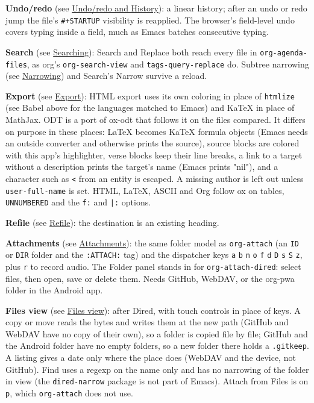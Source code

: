 \documentclass[11pt]{article}
\begin{document}
\textbf{Undo/redo} (see \hyperref[sec:org82ca105]{Undo/redo and History}): a linear history; after an undo or redo jump the file's \texttt{\#+STARTUP} visibility is reapplied. The browser's field-level undo covers typing inside a field, much as Emacs batches consecutive typing.

\textbf{Search} (see \hyperref[sec:org22ae446]{Searching}): Search and Replace both reach every file in \texttt{org-agenda-files}, as org's \texttt{org-search-view} and \texttt{tags-query-replace} do. Subtree narrowing (see \hyperref[sec:org4bc1b50]{Narrowing}) and Search's Narrow survive a reload.

\textbf{Export} (see \hyperref[sec:org9a53e51]{Export}): HTML export uses its own coloring in place of \texttt{htmlize} (see Babel above for the languages matched to Emacs) and KaTeX in place of MathJax. ODT is a port of ox-odt that follows it on the files compared. It differs on purpose in these places: \LaTeX{} becomes KaTeX formula objects (Emacs needs an outside converter and otherwise prints the source), source blocks are colored with this app's highlighter, verse blocks keep their line breaks, a link to a target without a description prints the target's name (Emacs prints "nil"), and a character such as \texttt{<} from an entity is escaped. A missing author is left out unless \texttt{user-full-name} is set. HTML, \LaTeX{}, ASCII and Org follow ox on tables, \texttt{UNNUMBERED} and the \texttt{f:} and \texttt{|:} options.

\textbf{Refile} (see \hyperref[sec:orgf424d46]{Refile}): the destination is an existing heading.

\textbf{Attachments} (see \hyperref[sec:org970e59b]{Attachments}): the same folder model as \texttt{org-attach} (an \texttt{ID} or \texttt{DIR} folder and the \texttt{:ATTACH:} tag) and the dispatcher keys \texttt{a} \texttt{b} \texttt{n} \texttt{o} \texttt{f} \texttt{d} \texttt{D} \texttt{s} \texttt{S} \texttt{z}, plus \texttt{r} to record audio. The Folder panel stands in for \texttt{org-attach-dired}: select files, then open, save or delete them. Needs GitHub, WebDAV, or the org-pwa folder in the Android app.

\textbf{Files view} (see \hyperref[sec:org45e6d31]{Files view}): after Dired, with touch controls in place of keys. A copy or move reads the bytes and writes them at the new path (GitHub and WebDAV have no copy of their own), so a folder is copied file by file; GitHub and the Android folder have no empty folders, so a new folder there holds a \texttt{.gitkeep}. A listing gives a date only where the place does (WebDAV and the device, not GitHub). Find uses a regexp on the name only and has no narrowing of the folder in view (the \texttt{dired-narrow} package is not part of Emacs). Attach from Files is on \texttt{p}, which \texttt{org-attach} does not use.
\end{document}
